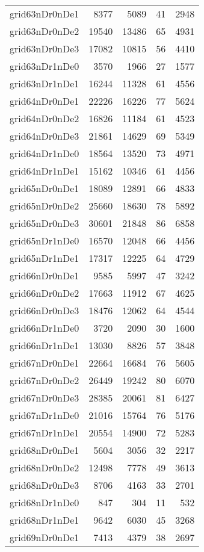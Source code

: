 \begin{longtable}{lrrrr}
grid63nDr0nDe1 & 8377 & 5089 & 41 & 2948 \\
grid63nDr0nDe2 & 19540 & 13486 & 65 & 4931 \\
grid63nDr0nDe3 & 17082 & 10815 & 56 & 4410 \\
grid63nDr1nDe0 & 3570 & 1966 & 27 & 1577 \\
grid63nDr1nDe1 & 16244 & 11328 & 61 & 4556 \\
grid64nDr0nDe1 & 22226 & 16226 & 77 & 5624 \\
grid64nDr0nDe2 & 16826 & 11184 & 61 & 4523 \\
grid64nDr0nDe3 & 21861 & 14629 & 69 & 5349 \\
grid64nDr1nDe0 & 18564 & 13520 & 73 & 4971 \\
grid64nDr1nDe1 & 15162 & 10346 & 61 & 4456 \\
grid65nDr0nDe1 & 18089 & 12891 & 66 & 4833 \\
grid65nDr0nDe2 & 25660 & 18630 & 78 & 5892 \\
grid65nDr0nDe3 & 30601 & 21848 & 86 & 6858 \\
grid65nDr1nDe0 & 16570 & 12048 & 66 & 4456 \\
grid65nDr1nDe1 & 17317 & 12225 & 64 & 4729 \\
grid66nDr0nDe1 & 9585 & 5997 & 47 & 3242 \\
grid66nDr0nDe2 & 17663 & 11912 & 67 & 4625 \\
grid66nDr0nDe3 & 18476 & 12062 & 64 & 4544 \\
grid66nDr1nDe0 & 3720 & 2090 & 30 & 1600 \\
grid66nDr1nDe1 & 13030 & 8826 & 57 & 3848 \\
grid67nDr0nDe1 & 22664 & 16684 & 76 & 5605 \\
grid67nDr0nDe2 & 26449 & 19242 & 80 & 6070 \\
grid67nDr0nDe3 & 28385 & 20061 & 81 & 6427 \\
grid67nDr1nDe0 & 21016 & 15764 & 76 & 5176 \\
grid67nDr1nDe1 & 20554 & 14900 & 72 & 5283 \\
grid68nDr0nDe1 & 5604 & 3056 & 32 & 2217 \\
grid68nDr0nDe2 & 12498 & 7778 & 49 & 3613 \\
grid68nDr0nDe3 & 8706 & 4163 & 33 & 2701 \\
grid68nDr1nDe0 & 847 & 304 & 11 & 532 \\
grid68nDr1nDe1 & 9642 & 6030 & 45 & 3268 \\
grid69nDr0nDe1 & 7413 & 4379 & 38 & 2697 \\

\end{longtable}
